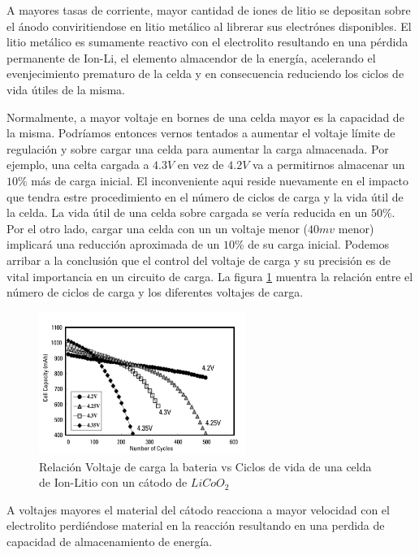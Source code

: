 \documentclass[10pt,a4paper]{article}
\begin{document}
A mayores tasas de corriente, mayor cantidad de iones de litio se depositan
sobre el ánodo conviritiendose en litio metálico al librerar sus electrónes
disponibles.  El litio metálico es sumamente reactivo con el electrolito
resultando en una pérdida permanente de \acrshort{Ion-Li}, el elemento
almacendor de la energía, acelerando el evenjecimiento prematuro de la celda y
en consecuencia reduciendo los ciclos de vida útiles de la misma. 

Normalmente, a mayor voltaje en bornes de una celda mayor es la capacidad de la
misma. Podríamos entonces vernos tentados a aumentar el voltaje límite de
regulación y sobre cargar una celda para aumentar la carga almacenada. Por
ejemplo, una celta cargada a $4.3V$ en vez de $4.2V$ va a permitirnos almacenar
un $10\%$ más de carga inicial. El inconveniente aqui reside nuevamente en el
impacto que tendra estre procedimiento en el número de ciclos de carga y la vida
útil de la celda. La vida útil de una celda sobre cargada se vería reducida en
un $50\%$.  Por el otro lado, cargar una celda con un un voltaje menor ($40mv$
menor) implicará una reducción aproximada de un $10\%$ de su carga inicial.
Podemos arribar a la conclusión que el control del voltaje de carga y su
precisión es de vital importancia en un circuito de carga. La figura
\ref{fig:C_vs_Cycle_V} muentra la relación entre el número de ciclos de carga y
los diferentes voltajes de carga. 

\begin{figure}[h!] \centering
    \includegraphics[width=0.6\textwidth]{bat_char/C_vs_Cycle_V.png}
    \caption{Relación Voltaje de carga la bateria vs Ciclos de vida de una celda de
Ion-Litio con un cátodo de $LiCoO_2$} \label{fig:C_vs_Cycle_V} \end{figure}
\FloatBarrier

A voltajes mayores el material del cátodo reacciona a mayor velocidad con el
electrolito perdiéndose material en la reacción resultando en una perdida de
capacidad de almacenamiento de energía. 
\end{document}
